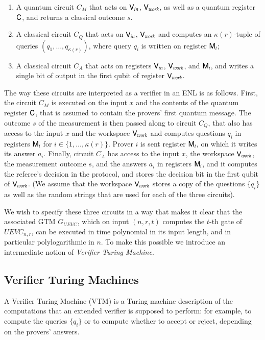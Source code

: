 \begin{enumerate}
\item A quantum circuit $C_M$ that acts on ${\mathsf{V}}_{in}$, ${\mathsf{V}}_{work}$, as well as a quantum register ${\mathsf{C}}$, and returns a classical outcome $s$. %
\item A classical circuit $C_Q$ that acts on ${\mathsf{V}}_{in}$, ${\mathsf{V}}_{work}$ %
and computes an $\kappa(r)$-tuple of queries $(q_1,\ldots,q_{\kappa(r)})$, where query $q_i$ is written on register ${\mathsf{M}}_i$;
\item A classical circuit $C_A$ that acts on registers ${\mathsf{V}}_{in}$, ${\mathsf{V}}_{work}$, %
and ${\mathsf{M}}_{i}$, and writes a single bit of output in the first qubit of register ${\mathsf{V}}_{work}$. %
\end{enumerate}
The way these circuits are interpreted as a verifier in an ENL is as follows. First, the circuit $C_M$ is executed on the input $x$ and the contents of the quantum register ${\mathsf{C}}$, that is assumed to contain the provers' first quantum message. The outcome $s$ of the measurement is then passed along to circuit $C_Q$, that also has access to the input $x$ and the workspace ${\mathsf{V}}_{work}$ and computes questions $q_i$ in registers ${\mathsf{M}}_{i}$ for $i\in\{1,\ldots,\kappa(r)\}$. Prover $i$ is sent register ${\mathsf{M}}_i$, on which it writes its answer $a_i$. Finally, circuit $C_A$ has access to the input $x$, the workspace ${\mathsf{V}}_{work}$, the measurement outcome $s$, and the answers $a_i$ in registers ${\mathsf{M}}_i$, and it computes the referee's decision in the protocol, and stores the decision bit in the first qubit of ${\mathsf{V}}_{work}$. (We assume that the workspace ${\mathsf{V}}_{work}$ stores a copy of the questions $\{q_i\}$ as well as the random strings that are used for each of the three circuits). 

We wish to specify these three circuits in a way that makes it clear that the associated GTM $G_{UEVC}$, which on input $(n,r,t)$ computes the $t$-th gate of $UEVC_{n,r}$, can be executed in time polynomial in its input length, and in particular polylogarithmic in $n$. To make this possible we introduce an intermediate notion of \emph{Verifier Turing Machine}. 


\subsection{ Verifier Turing Machines}
\label{sec:vtm}

A Verifier Turing Machine (VTM) is a Turing machine description of the computations that an extended verifier is supposed to perform: for example, to compute the queries $\{q_i\}$ or to compute whether to accept or reject, depending on the provers' answers.


